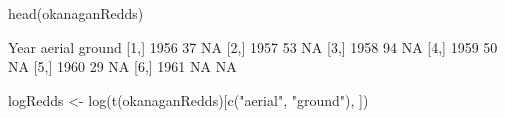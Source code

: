 \begin{Schunk}
\begin{Sinput}
 head(okanaganRedds)
\end{Sinput}
\begin{Soutput}
     Year aerial ground
[1,] 1956     37     NA
[2,] 1957     53     NA
[3,] 1958     94     NA
[4,] 1959     50     NA
[5,] 1960     29     NA
[6,] 1961     NA     NA
\end{Soutput}
\begin{Sinput}
 logRedds <- log(t(okanaganRedds)[c("aerial", "ground"), ])
\end{Sinput}
\end{Schunk}
